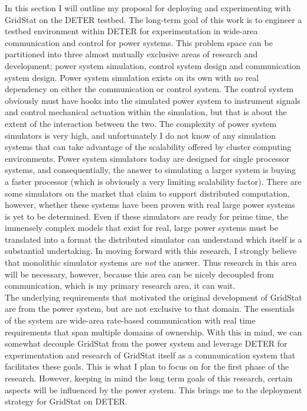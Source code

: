 \documentclass{article}
\begin{document}
In this section I will outline my proposal for deploying and experimenting with GridStat
 on the DETER testbed.  The long-term goal of this work is to engineer a testbed 
environment within DETER for experimentation in wide-area communication and control
 for power systems.  This problem space can be partitioned into three almost mutually 
exclusive areas of research and development;  power system simulation, control system 
design and communication system design.  Power system simulation exists on its own with 
no real dependency on either the communication or control system.  The control system
 obviously must have hooks into the simulated power system to instrument signals and 
control mechanical actuation within the simulation, but that is about the extent of 
the interaction between the two.  The complexity of power system simulators is very 
high, and unfortunately I do not know of any simulation systems that can take advantage 
of the scalability offered by cluster computing environments.  Power system simulators 
today are designed for single processor systems, and consequentially, the answer to 
simulating a larger system is buying a faster processor (which is obviously a very 
limiting scalability factor).  There are some simulators on the market that claim to 
support distributed computation, however, whether these systems have been proven with 
real large power systems is yet to be determined.  Even if these simulators are ready 
for prime time, the immensely complex models that exist for real, large power systems 
must be translated into a format the distributed simulator can understand which itself 
is a substantial undertaking.  In moving forward with this research, I strongly believe 
that monolithic simulator systems are \emph{not} the answer. Thus research in this area 
will be necessary, however, because this area can be nicely decoupled from communication,
 which is my primary research area, it can wait.  \\


The underlying requirements that motivated the original development of GridStat are 
from the power system, but are not exclusive to that domain.  The essentials of the 
system are wide-area rate-based communication with real time requirements that span 
multiple domains of ownership.  With this in mind, we can somewhat decouple GridStat 
from the power system and leverage DETER for experimentation and research of GridStat
 itself as a communication system that facilitates these goals.  This is what I plan
 to focus on for the first phase of the research.  However, keeping in mind the long 
term goals of this research, certain aspects will be influenced by the power system. 
 This brings me to the deployment strategy for GridStat on DETER. \\
\end{document}
